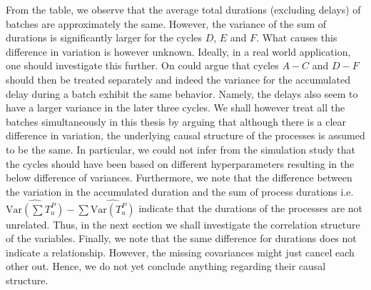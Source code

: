 \documentclass[../Thesis.tex]{subfiles}
\begin{document}
From the table, we observe that the average total durations (excluding delays) of batches are approximately the same. However, the variance of the sum of durations is significantly larger for the cycles $D$, $E$ and $F$. What causes this difference in variation is however unknown. Ideally, in a real world application, one should investigate this further. On could argue that cycles $A-C$ and $D-F$ should then be treated separately and indeed the variance for the accumulated delay during a batch exhibit the same behavior. Namely, the delays also seem to have a larger variance in the later three cycles. We shall however treat all the batches simultaneously in this thesis by arguing that although there is a clear difference in variation, the underlying causal structure of the processes is assumed to be the same. In particular, we could not infer from the simulation study \cite{benchmark-model-to-generate-batch-process-data} that the cycles should have been based on different hyperparameters resulting in the below difference of variances. Furthermore, we note that the difference between the variation in the accumulated duration and the sum of process durations i.e. $\widehat{\text{Var}\left(\sum T^P_u\right)} - \sum \widehat{\text{Var}\left(T^P_u\right)}$ indicate that the durations of the processes are not unrelated. Thus, in the next section we shall investigate the correlation structure of the variables. Finally, we note that the same difference for durations does not indicate a relationship. However, the missing covariances might just cancel each other out. Hence, we do not yet conclude anything regarding their causal structure.
\end{document}
